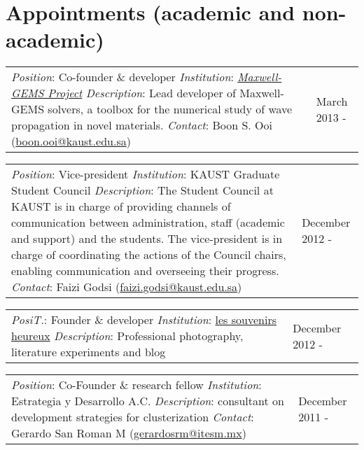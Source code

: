 \documentclass[margin,10pt]{res}
\newcommand{\subs}[1]{\normalfont #1}
\newcommand{\httpmg}{http://github.com/damiansra/maxwell-gems}
\newcommand{\secs}[1]{\normalsize{\section{\subs{#1}}}}
\begin{document}
\secs{Appointments (academic and non-academic)}

\begin{tabular}{p{3.8in} l}
 \emph{Position}: Co-founder \& developer  \newline \emph{Institution}: \href{\httpmg}{\emph{Maxwell-GEMS Project}} \newline \emph{Description}: Lead developer of Maxwell-GEMS solvers, a toolbox for the numerical study of wave propagation in novel materials. \newline \emph{Contact}: Boon S. Ooi (\href{mailto:boon.ooi@kaust.edu.sa}{boon.ooi@kaust.edu.sa}) \newline & March 2013 - 
\end{tabular}

\begin{tabular}{p{3.8in} l}
 \emph{Position}: Vice-president  \newline \emph{Institution}: KAUST Graduate Student Council \newline \emph{Description}: The Student Council at KAUST is in charge of providing channels of communication between administration, staff (academic and support) and the students. The vice-president is in charge of coordinating the actions of the Council chairs, enabling communication and overseeing their progress. \newline \emph{Contact}: Faizi Godsi (\href{mailto:faizi.godsi@kaust.edu.sa}{faizi.godsi@kaust.edu.sa}) \newline & December 2012 - 
\end{tabular}

\begin{tabular}{p{3.8in} l}
 \emph{PosiT.}: Founder \& developer \newline \emph{Institution}: \href{http://www.souvenirsheureux.com}{les souvenirs heureux} \newline \emph{Description}: Professional photography, literature experiments and blog \newline & December 2012 - 
\end{tabular}

\begin{tabular}{p{3.8in} l}
 \emph{Position}: Co-Founder \& research fellow  \newline \emph{Institution}: Estrategia y Desarrollo A.C. \newline \emph{Description}: consultant on development strategies for clusterization \newline \emph{Contact}: Gerardo San Roman M (\href{mailto:gerardosrm@itesm.mx}{gerardosrm@itesm.mx}) \newline & December 2011 - 
\end{tabular}
\end{document}
